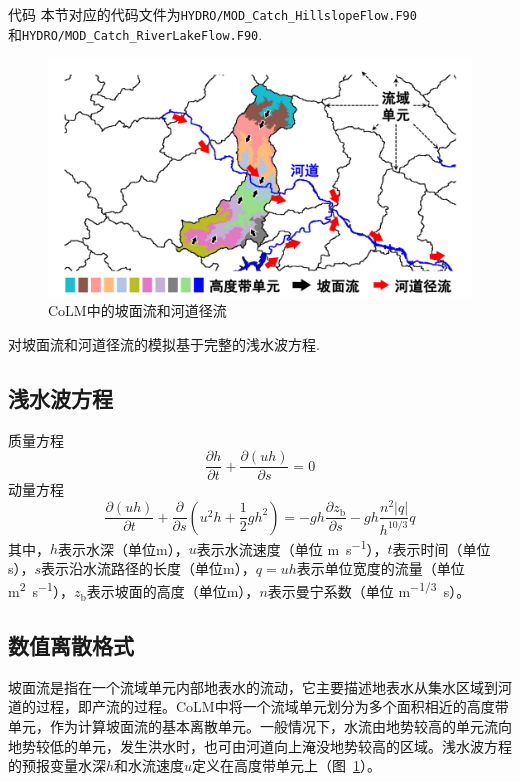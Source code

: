 \begin{mymdframed}{代码}
  本节对应的代码文件为\texttt{HYDRO/MOD\_Catch\_HillslopeFlow.F90} \\
  和\texttt{HYDRO/MOD\_Catch\_RiverLakeFlow.F90}.
\end{mymdframed}

{
  \begin{figure}[htbp]
    \centering
    \includegraphics[width=\textwidth]{Figures/侧向流/坡面流和河道径流.pdf}
    \caption{CoLM中的坡面流和河道径流}
    \label{fig:坡面流和河道径流}
  \end{figure}
}

对坡面流和河道径流的模拟基于完整的浅水波方程.
\subsection{浅水波方程}
质量方程
\begin{equation}
  \frac{\partial h}{\partial t} + \frac{\partial \left(uh\right)}{\partial s} = 0
\end{equation}
动量方程
\begin{equation}
  \frac{\partial \left(uh\right)}{\partial t} + \frac{\partial}{\partial s}\left(u^2h+\frac{1}{2}gh^2\right) = -gh\frac{\partial z_{\mathrm {b}} }{\partial s}-gh\frac{n^2\left|q\right|}{h^{10/3}}q
\end{equation}
其中，$h$表示水深（单位m），$u$表示水流速度（单位 \unit{m.s^{-1}}），$t$表示时间（单位s），$s$表示沿水流路径的长度（单位m），$q=uh$表示单位宽度的流量（单位 \unit{m^2.s^{-1}}），$z_{\mathrm {b}} $表示坡面的高度（单位m），$n$表示曼宁系数（单位 \unit{m^{-1/3}.s}）。


\subsection{数值离散格式}
坡面流是指在一个流域单元内部地表水的流动，它主要描述地表水从集水区域到河道的过程，即产流的过程。CoLM中将一个流域单元划分为多个面积相近的高度带单元，作为计算坡面流的基本离散单元。一般情况下，水流由地势较高的单元流向地势较低的单元，发生洪水时，也可由河道向上淹没地势较高的区域。浅水波方程的预报变量水深$h$和水流速度$u$定义在高度带单元上（图~\ref{fig:坡面流和河道径流}）。

